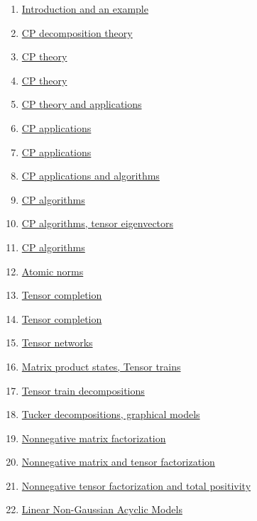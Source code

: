 \documentclass[11pt]{article}
\begin{document}
\begin{enumerate}
	\item \href{https://mp.weixin.qq.com/s/tC7HQt0DioJjdeuGtuU0OQ}{Introduction and an example}	%
	\item \href{https://mp.weixin.qq.com/s/rwWTVBWNtC-I4qxz_MlqKg}{CP decomposition theory}	%
	\item \href{https://mp.weixin.qq.com/s/EIistMY7I5Y2f9mzM8Pfgg}{CP theory}	%
	\item \href{https://mp.weixin.qq.com/s/lcQFQv6bAFae7E3-3RmiKg}{CP theory}	%
	\item \href{https://mp.weixin.qq.com/s/QXVj3Cq_ZJsgAxRexvndhQ}{CP theory and applications}	%
	\item \href{https://mp.weixin.qq.com/s/WkNjZ-fhHGXMdPV5K70rjQ}{CP applications}	%
	\item \href{https://mp.weixin.qq.com/s/1tA-mzg1C80p1p6WrifrHA}{CP applications}	%
	\item \href{https://mp.weixin.qq.com/s/phKznPIKUm-Gyq0f0-qayQ}{CP applications and algorithms}	%
	\item \href{https://mp.weixin.qq.com/s/F_kFC3g1xKYi8rNC6M5pqw}{CP algorithms}	%
	\item \href{https://mp.weixin.qq.com/s/lZ07yOeACMd_hL7Qs076Dg}{CP algorithms, tensor eigenvectors}	%
	\item \href{https://mp.weixin.qq.com/s/knICdT53Ws8_hUeRBDPXkg}{CP algorithms}	%
	\item \href{https://mp.weixin.qq.com/s/PmJEdZDNXk9F802uSRxjNg}{Atomic norms}	%
	\item \href{https://mp.weixin.qq.com/s/q4VM84jBHl5D1zFJvdWvXA}{Tensor completion}	%
	\item \href{https://mp.weixin.qq.com/s/vDeJ2LbPnhy0Tdf20giiyw}{Tensor completion}	%
	\item \href{https://mp.weixin.qq.com/s/1Hz1p59q_51952XWkvFYxA}{Tensor networks}	%
	\item \href{https://mp.weixin.qq.com/s/ld4AjEu-X0inZTzE0RI2cg}{Matrix  product states, Tensor trains}	%
	\item \href{https://mp.weixin.qq.com/s/1-ghPDGrtfDrm81PPw_h5A}{Tensor train decompositions}	%
	\item \href{https://mp.weixin.qq.com/s/p2Dv0c42hLYu9-rhH-DSmw}{Tucker decompositions, graphical models}	%
	\item \href{https://mp.weixin.qq.com/s/3RmTLD8FyTIt9ggTEX5Y3A}{Nonnegative matrix factorization}	%
	\item \href{https://mp.weixin.qq.com/s/XDn2zq6PZcsQ4-pfg7DADw}{Nonnegative matrix and tensor factorization}	%
	\item \href{https://mp.weixin.qq.com/s/9-kisLnFAG7visf5z84b7g}{Nonnegative tensor factorization and total positivity}	%
	\item \href{https://mp.weixin.qq.com/s/MDOhwmX-GKMm4sYi3IVTjA}{Linear Non-Gaussian Acyclic Models}	%
\end{enumerate}
\end{document}
